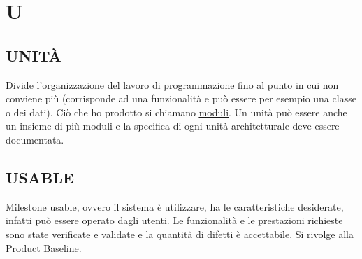 \newpage
	\flushright{\hyperref[index]{\color{black!65}{Ritorna all'indice}}}\flushleft
	\section{U} \label{sec:U}		
	
		\subsection{UNITÀ}	 \label{unita}	
		Divide l'organizzazione del lavoro di programmazione fino al punto in cui non conviene più (corrisponde ad una funzionalità e può essere per esempio una classe o dei dati). Ciò che ho prodotto si chiamano \underline{\hyperref[moduli]{moduli}}. Un unità può essere anche un insieme di più moduli e la specifica di ogni unità architetturale deve essere documentata.
	
		\subsection{USABLE}		\label{usable}
		Milestone usable, ovvero il sistema è utilizzare, ha le caratteristiche desiderate, infatti può essere operato dagli utenti. Le funzionalità e le prestazioni richieste sono state verificate e validate e la quantità di difetti è accettabile. Si rivolge alla \underline{\hyperref[productbaseline]{Product Baseline}}.
	
	
